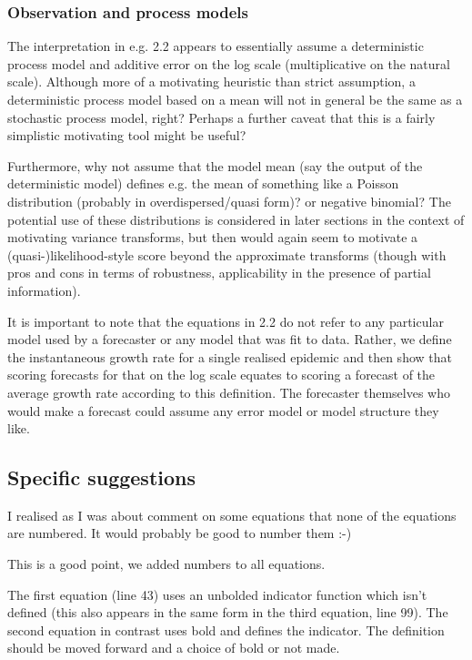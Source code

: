 \documentclass{article}
\newcommand{\black}{\color{black}}
\newcommand{\blue}{\color{blue}}
\begin{document}
\blue
\subsubsection{Observation and process models}
The interpretation in e.g. 2.2 appears to essentially assume a deterministic process model and additive error on the log scale (multiplicative on the natural scale). Although more of a motivating heuristic than strict assumption, a deterministic process model based on a mean will not in general be the same as a stochastic process model, right? Perhaps a further caveat that this is a fairly simplistic motivating tool might be useful?

Furthermore, why not assume that the model mean (say the output of the deterministic model) defines e.g. the mean of something like a Poisson distribution (probably in overdispersed/quasi form)? or negative binomial? The potential use of these distributions is considered in later sections in the context of motivating variance transforms, but then would again seem to motivate a (quasi-)likelihood-style score beyond the approximate transforms (though with pros and cons in terms of robustness, applicability in the presence of partial information).

\black
It is important to note that the equations in 2.2 do not refer to any particular model used by a forecaster or any model that was fit to data. Rather, we define the instantaneous growth rate for a single realised epidemic and then show that scoring forecasts for that on the log scale equates to scoring a forecast of the average growth rate according to this definition. The forecaster themselves who would make a forecast could assume any error model or model structure they like. 

\blue
\subsection{Specific suggestions}

I realised as I was about comment on some equations that none of the equations are numbered. It would probably be good to number them :-)

\black
This is a good point, we added numbers to all equations. 

\blue
The first equation (line 43) uses an unbolded indicator function which isn’t defined (this also appears in the same form in the third equation, line 99). The second equation in contrast uses bold and defines the indicator. The definition should be moved forward and a choice of bold or not made.
\end{document}
